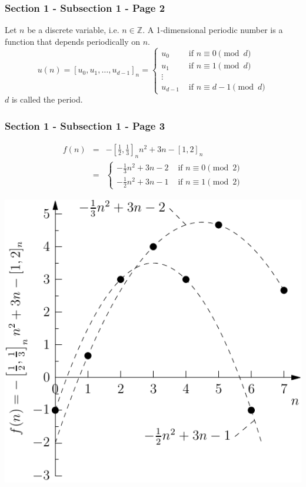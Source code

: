 \documentclass{beamer}
\newcommand{\field}[1]{\mathbb{#1}}
\newcommand{\Zset}{\field{Z}}
\begin{document}
\begin{frame}\frametitle{Section 1 - Subsection 1 - Page 2}
	\begin{definition}
		Let $n$ be a discrete variable, i.e. $n\in\Zset$.
		A 1-dimensional periodic number is a function that depends periodically on $n$.
		$$
		u(n)=
		[u_0,u_1,\ldots,u_{d-1}]_n=
		\begin{cases}
			u_0 & \mbox{ if $n\equiv 0 \pmod d$} \\
			u_1 & \mbox{ if $n\equiv 1 \pmod d$} \\
			\vdots \\
			u_{d-1} & \mbox{ if $n\equiv d-1 \pmod d$}
		\end{cases}
		$$
		$d$ is called the period.
	\end{definition}
\end{frame}

\begin{frame}\frametitle{Section 1 - Subsection 1 - Page 3}
	\begin{example}
		\centering
		{
		$$
		\begin{array}{rcl}
			f(n)
			&=&
			-\left[\frac{1}{2},\frac{1}{3}\right]_n n^2
			+3n-[1,2]_n
			\\
			&=&
			\begin{cases}
				-\frac{1}{3} n^2 +3n-2
				& \text{ if $n\equiv 0 \pmod 2$} \\
				-\frac{1}{2} n^2 +3n-1
				& \text{ if $n\equiv 1 \pmod 2$}
			\end{cases}
		\end{array}
		$$
		\begin{minipage}{0.4\textwidth}
			\includegraphics[width=\textwidth]{images/ex2_quasi_polynomial.pdf}
		\end{minipage}
		}
	\end{example}
\end{frame}
\end{document}
